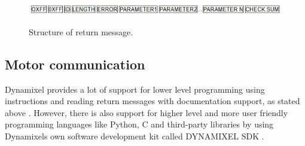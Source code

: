 \begin{figure}[H]
    \graphicspath{ {img/} }
    \centering
    
    \includegraphics[width = 9 cm]{img/return_packadge.JPG}
    \label{return}
    \caption{Structure of return message.}
\end{figure}

\subsection{Motor communication}
Dynamixel provides a lot of support for lower level programming using instructions and reading return messages with documentation support, as stated above
. However, there is also support for higher level and more user friendly programming languages like Python,
C and third-party libraries by using Dynamixels own software development kit called DYNAMIXEL SDK \cite{dynamixel_SDK}.


